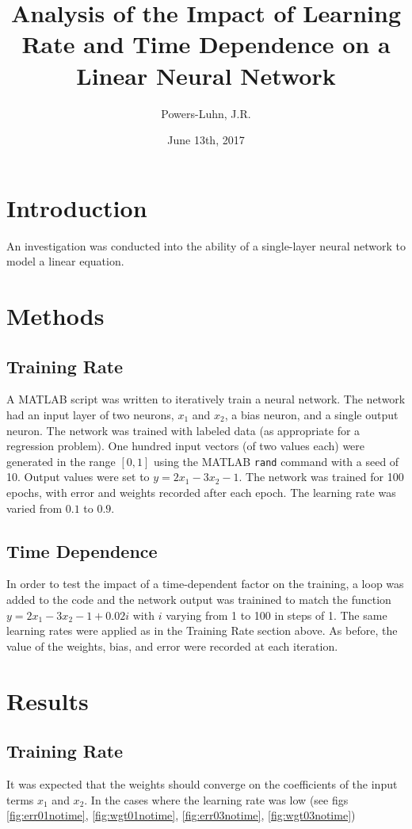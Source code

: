 \documentclass{IEEEtran}
\author{Powers-Luhn, J.R.}
\title{Analysis of the Impact of Learning Rate and Time Dependence on a Linear Neural Network}
\date{June 13th, 2017}
\begin{document}
\maketitle

\section{Introduction}
An investigation was conducted into the ability of a single-layer neural network to model a linear equation.

\section{Methods}
\subsection{Training Rate}
A MATLAB script was written to iteratively train a neural network. The network had an input layer of two neurons, $x_1$ and $x_2$, a bias neuron, and a single output neuron. The network was trained with labeled data (as appropriate for a regression problem). One hundred input vectors (of two values each) were generated in the range $[0,1]$ using the MATLAB \verb|rand| command with a seed of 10. Output values were set to $ y=2x_1 - 3x_2 -1 $. The network was trained for 100 epochs, with error and weights recorded after each epoch. The learning rate was varied from $0.1$ to $0.9$.

\subsection{Time Dependence}
In order to test the impact of a time-dependent factor on the training, a loop was added to the code and the network output was trainined to match the function $ y=2x_1 - 3x_2 -1 + 0.02i $ with $i$ varying from 1 to 100 in steps of 1. The same learning rates were applied as in the Training Rate section above. As before, the value of the weights, bias, and error were recorded at each iteration.

\section{Results}
\subsection{Training Rate}
It was expected that the weights should converge on the coefficients of the input terms $x_1$ and $x_2$. In the cases where the learning rate was low (see figs \ref{fig:err01notime}, \ref{fig:wgt01notime}, \ref{fig:err03notime}, \ref{fig:wgt03notime})
\end{document}
